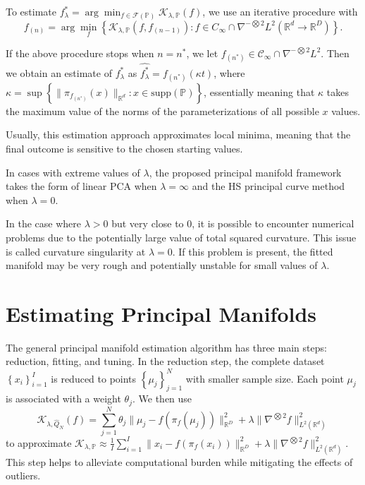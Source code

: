 To estimate $f_{\lambda}^{*} = \arg \min_{f \in \mathcal{F}(\mathbb{P})}\mathcal{K_{\lambda, \mathbb{P}}}(f)$, we use an iterative procedure with 
\[%
  f_{(n)} = \arg \min_f\left\{\mathcal{K}_{\lambda, \mathbb{P}}(f, f_{(n-1)}): f \in C_{\infty} \cap \nabla^{-\bigotimes 2}L^2(\mathbb{R}^{d} \to \mathbb{R}^{D})\right\}
.\]%

If the above procedure stops when $n = n^{*}$, we let $f_{(n^{*})} \in \mathcal{C}_{\infty} \cap \nabla^{-\bigotimes 2}L^2$. Then we obtain an estimate of $f_{\lambda}^{*}$ as $\hat{f_{\lambda}^{*}} = f_{(n^{*})}(\kappa t)$, where $\kappa = \sup\left\{\|\pi_{f_{(n^{*})}}(x)\|_{\mathbb{R}^{d}}: x \in \text{supp}(\mathbb{P})\right\}$, essentially meaning that $\kappa$ takes the maximum value of the norms of the parameterizations of all possible $x$ values.

Usually, this estimation approach approximates local minima, meaning that the final outcome is sensitive to the chosen starting values.

In cases with extreme values of $\lambda$, the proposed principal manifold framework takes the form of linear PCA when $\lambda = \infty$ and the HS principal curve method when $\lambda = 0$.

In the case where $\lambda > 0$ but very close to 0, it is possible to encounter numerical problems due to the potentially large value of total squared curvature. This issue is called curvature singularity at $\lambda = 0$. If this problem is present, the fitted manifold may be very rough and potentially unstable for small values of $\lambda$.

\section*{Estimating Principal Manifolds}

The general principal manifold estimation algorithm has three main steps: reduction, fitting, and tuning. In the reduction step, the complete dataset $\left\{x_i\right\}_{i = 1}^{I}$ is reduced to points $\left\{\mu_j\right\}_{j=1}^{N}$ with smaller sample size.  Each point $\mu_j$ is associated with a weight $\theta_j$. We then use \[%
  \mathcal{K}_{\lambda, \hat{Q}_N}(f) = \sum_{j=1}^{N}\theta_j\|\mu_j - f(\pi_f(\mu_j))\|_{\mathbb{R}^{D}}^2 + \lambda\|\nabla^{\bigotimes 2}f\|_{L^2(\mathbb{R}^{d})}^2
\]%
to approximate $\mathcal{K}_{\lambda, \mathbb{P}} \approx \frac{1}{I}\sum_{i=1}^{I}\|x_i - f(\pi_f(x_i))\|_{\mathbb{R}^{D}}^2 + \lambda\|\nabla^{\bigotimes 2}f\|_{L^2(\mathbb{R}^{d})}^2$. This step helps to alleviate computational burden while mitigating the effects of outliers. 

